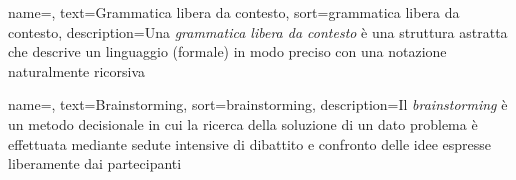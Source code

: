 {
	name=,
	text=Grammatica libera da contesto,
	sort=grammatica libera da contesto,
	description={Una \emph{grammatica libera da contesto} è una struttura astratta che descrive un linguaggio (formale) in modo preciso con una notazione naturalmente ricorsiva}
}

{
	name=,
	text=Brainstorming,
	sort=brainstorming,
	description={Il \emph{brainstorming} è un metodo decisionale in cui la ricerca della soluzione di un dato problema è effettuata mediante sedute intensive di dibattito e confronto delle idee espresse liberamente dai partecipanti}
}
